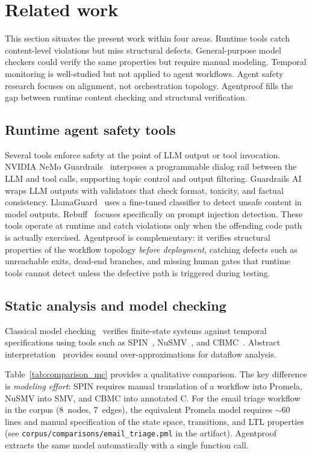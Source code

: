 \section{Related work}
\label{sec:related_work}

This section situates the present work within four areas. Runtime tools catch
content-level violations but miss structural defects. General-purpose
model checkers could verify the same properties but require manual
modeling. Temporal monitoring is well-studied but not applied to agent
workflows. Agent safety research focuses on alignment, not
orchestration topology. Agentproof fills the gap between runtime
content checking and structural verification.

\subsection{Runtime agent safety tools}

Several tools enforce safety at the point of LLM output or tool invocation.
NVIDIA NeMo Guardrails~\citep{nemo_guardrails} interposes a programmable
dialog rail between the LLM and tool calls, supporting topic control and
output filtering.
Guardrails AI~\citep{guardrails_ai} wraps LLM outputs with validators
that check format, toxicity, and factual consistency.
LlamaGuard~\citep{llamaguard} uses a fine-tuned classifier to detect
unsafe content in model outputs.
Rebuff~\citep{rebuff} focuses specifically on prompt injection detection.
These tools operate at runtime and catch violations only when the
offending code path is actually exercised.
Agentproof is complementary: it verifies structural properties of the
workflow topology \emph{before deployment}, catching defects such as
unreachable exits, dead-end branches, and missing human gates that
runtime tools cannot detect unless the defective path is triggered
during testing.

\subsection{Static analysis and model checking}

Classical model checking~\citep{clarke1999modelchecking} verifies
finite-state systems against temporal specifications using tools such as
SPIN~\citep{holzmann1997spin}, NuSMV~\citep{cimatti2002nusmv}, and
CBMC~\citep{cbmc}. Abstract interpretation~\citep{cousot1977abstract}
provides sound over-approximations for dataflow analysis.

Table~\ref{tab:comparison_mc} provides a qualitative comparison.
The key difference is \emph{modeling effort}: SPIN requires manual
translation of a workflow into Promela, NuSMV into SMV, and CBMC into
annotated C. For the email triage workflow in the corpus (8~nodes,
7~edges), the equivalent Promela model requires ${\sim}60$ lines and
manual specification of the state space, transitions, and LTL
properties (see \texttt{corpus/comparisons/email\_triage.pml} in the
artifact). Agentproof extracts the same model automatically with a
single function call.

